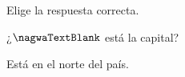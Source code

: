 
\begin{question}

\begin{instance}
  
\begin{mcq}[standalone=false]
    
\begin{stem}
      Elige la respuesta correcta.\par      
\begin{enumerationnolabel}
        \item{¿$\nagwaTextBlank$ está la capital?}          
        \item{Está en el norte del país.}      
\end{enumerationnolabel}
    
\end{stem}
    
\begin{distractors}
\end{distractors}
              
\end{mcq}

\end{instance}

\end{question}
